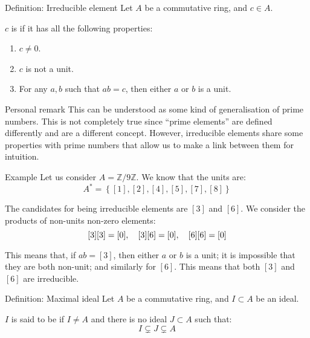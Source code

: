 \documentclass[a4paper]{article}
\begin{document}
\begin{parag}{Definition: Irreducible element}
    Let $A$ be a commutative ring, and $c \in A$.

    $c$ is  if it has all the following properties:
    \begin{enumerate}
        \item $c \neq 0$.
        \item $c$ is not a unit.
        \item For any $a, b$ such that $ab = c$, then either $a$ or $b$ is a unit.
    \end{enumerate}

    \begin{subparag}{Personal remark}
        This can be understood as some kind of generalisation of prime numbers. This is not completely true since ``prime elements'' are defined differently and are a different concept. However, irreducible elements share some properties with prime numbers that allow us to make a link between them for intuition.
    \end{subparag}
\end{parag}

\begin{parag}{Example}
    Let us consider $A =\mathbb{Z}/9\mathbb{Z}$. We know that the units are: 
    \[A^* = \left\{\left[1\right], \left[2\right], \left[4\right], \left[5\right], \left[7\right], \left[8\right]\right\}\]
    
    The candidates for being irreducible elements are $\left[3\right]$ and $\left[6\right]$. We consider the products of non-units non-zero elements:
    \[\left[3\right]\left[3\right] = \left[0\right], \mathspace \left[3\right]\left[6\right] = \left[0\right], \mathspace \left[6\right]\left[6\right] = \left[0\right]\]
    
    This means that, if $ab = \left[3\right]$, then either $a$ or $b$ is a unit; it is impossible that they are both non-unit; and similarly for $\left[6\right]$. This means that both $\left[3\right]$ and $\left[6\right]$ are irreducible.
\end{parag}

\begin{parag}{Definition: Maximal ideal}
    Let $A$ be a commutative ring, and $I \subset A$ be an ideal.

    $I$ is said to be  if $I \neq A$ and there is no ideal $J \subset A$ such that: 
    \[I \subsetneq J \subsetneq A\]
\end{parag}
\end{document}
